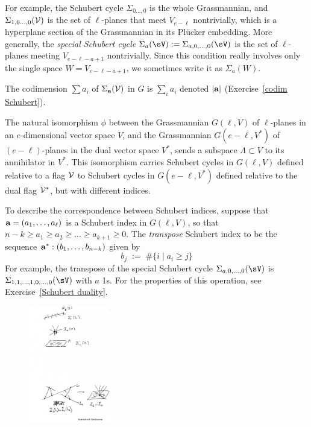 
 
For example, the Schubert cycle $\Sigma_{0\dots,0}$ is the whole Grassmannian, 
and $\Sigma_{1,0\dots,0}(\cal V)$ is the set of $\ell$-planes that meet $V_{e-\ell}$ nontrivially, which is
a hyperplane section of the Grassmannian in its Pl\"ucker embedding. 
More generally, the
\emph{special Schubert cycle} 
$\Sigma_a(\sV) := \Sigma_{a,0,\dots, 0}(\sV)$ 
is the set of $\ell$-planes
meeting  $V_{e-\ell - a+1}$ nontrivially.
Since this condition really involves only the single space $W = V_{e-\ell-a+1}$, we sometimes 
 write it
as $\Sigma_a(W)$. 

 The codimension $\sum a_i$ of $\Sigma_{\bf a}({\cal V})$ in $G$ is $\sum_i a_i$ denoted $|{\bf a}|$ (Exercise~\ref{codim Schubert}).

The natural isomorphism $\phi$ between the Grassmannian $G(\ell, V)$ of $\ell$-planes in an $e$-dimensional vector space $V$, and the Grassmannian  $G(e-\ell, V^*)$ of $(e-\ell)$-planes in  the dual vector space $V^*$, sends a subspace $\Lambda \subset V$ to its annihilator in $V^*$. This isomorphism carries Schubert cycles in $G(\ell, V)$ defined relative to a flag $\cal V$ to Schubert cycles in $G(e-\ell, V^*)$ defined relative to the dual flag ${\cal V}^*$, but with different indices.

To describe the correspondence between Schubert indices,
suppose that ${\bf a} = (a_1,\dots, a_{\ell})$ is a Schubert index in $G(\ell, V)$, so that $n-k \geq a_1 \geq a_2 \geq \dots \geq a_{k+1} \geq 0$. The \emph{transpose} Schubert index to be the sequence ${\bf a}^*:  (b_1,\dots, b_{n-k})$ given by 
$$
 b_j \; := \; \#\{ i \mid a_i \geq j \}
$$
For example, the transpose of the special Schubert cycle
$\Sigma_{a,0,\dots,0}(\sV)$ is 
$\Sigma_{1,1,\dots,1,0,\dots,0}(\sV)$ with $a$ 1s.
For the properties of this operation, see Exercise~\ref{Schubert duality}.



\begin{figure}
\begin{center}
\centerline {\includegraphics[height=2in]{"Fig12.1.pdf"}}
\caption{}
\label{default}
\end{center}
\end{figure}

